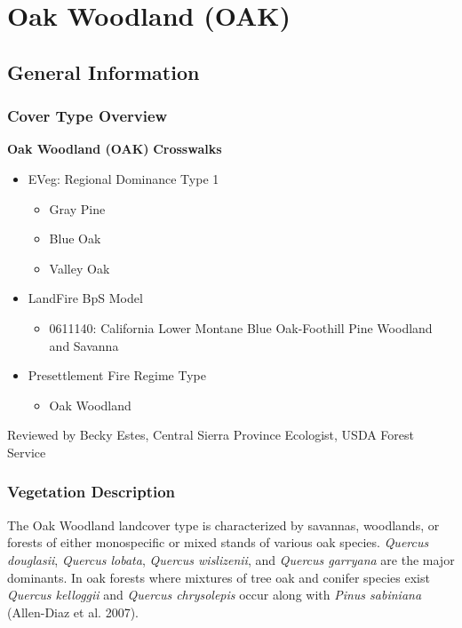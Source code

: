 \newpage
\section{Oak Woodland (OAK)}
\label{oak-description}

\subsection*{General Information}

\subsubsection*{Cover Type Overview}

\textbf{Oak Woodland (OAK)} 
\newline
\textbf{Crosswalks}
\begin{itemize}
	\item EVeg: Regional Dominance Type 1
	\begin{itemize}
		\item Gray Pine
		\item Blue Oak
		\item Valley Oak
	\end{itemize}

	\item LandFire BpS Model
	\begin{itemize}
		\item 0611140: California Lower Montane Blue Oak-Foothill Pine Woodland and Savanna
	\end{itemize}

	\item Presettlement Fire Regime Type
	\begin{itemize}
		\item Oak Woodland
	\end{itemize}
\end{itemize}

\noindent Reviewed by Becky Estes, Central Sierra Province Ecologist, USDA Forest Service

\subsubsection*{Vegetation Description}
The Oak Woodland landcover type is characterized by savannas, woodlands, or forests of either monospecific or mixed stands of various oak species. \emph{Quercus douglasii}, \emph{Quercus lobata}, \emph{Quercus wislizenii}, and \emph{Quercus garryana} are the major dominants. In oak forests where mixtures of tree oak and conifer species exist \emph{Quercus kelloggii} and \emph{Quercus chrysolepis} occur along with \emph{Pinus sabiniana} (Allen-Diaz et al. 2007). 

